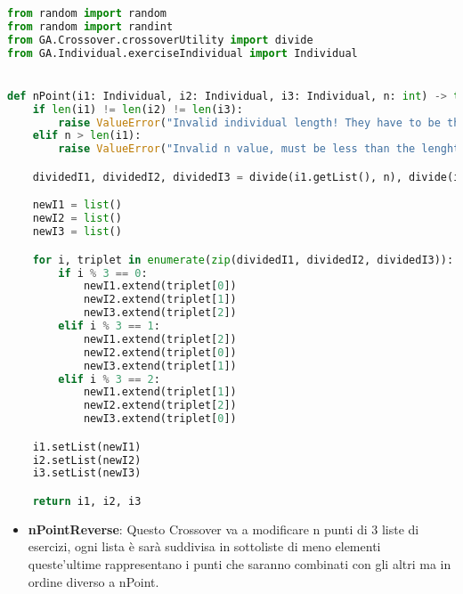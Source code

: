 \documentclass{article}
\begin{document}
\begin{lstlisting}[language=Python, breaklines, no caption]
from random import random
from random import randint
from GA.Crossover.crossoverUtility import divide
from GA.Individual.exerciseIndividual import Individual


def nPoint(i1: Individual, i2: Individual, i3: Individual, n: int) -> tuple[Individual, Individual, Individual]:
    if len(i1) != len(i2) != len(i3):
        raise ValueError("Invalid individual length! They have to be the same.")
    elif n > len(i1):
        raise ValueError("Invalid n value, must be less than the lenght of the individual!")

    dividedI1, dividedI2, dividedI3 = divide(i1.getList(), n), divide(i2.getList(), n), divide(i3.getList(), n)

    newI1 = list()
    newI2 = list()
    newI3 = list()

    for i, triplet in enumerate(zip(dividedI1, dividedI2, dividedI3)):
        if i % 3 == 0:
            newI1.extend(triplet[0])
            newI2.extend(triplet[1])
            newI3.extend(triplet[2])
        elif i % 3 == 1:
            newI1.extend(triplet[2])
            newI2.extend(triplet[0])
            newI3.extend(triplet[1])
        elif i % 3 == 2:
            newI1.extend(triplet[1])
            newI2.extend(triplet[2])
            newI3.extend(triplet[0])

    i1.setList(newI1)
    i2.setList(newI2)
    i3.setList(newI3)

    return i1, i2, i3
\end{lstlisting}
\begin{itemize}
\item\textbf{nPointReverse}: Questo Crossover va a modificare n punti di 3 liste di esercizi, ogni lista è sarà suddivisa in sottoliste di meno elementi queste'ultime rappresentano i punti che saranno combinati con gli altri ma in ordine diverso a nPoint.
\end{itemize}
\end{document}
